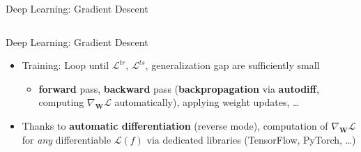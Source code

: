 \begin{frame}{Deep Learning: Gradient Descent}
\begin{columns}[T]
\begin{column}{0.6\textwidth}
\end{column}
\end{columns}
\end{frame}

\begin{frame}{Deep Learning: Gradient Descent}
\protect\hypertarget{deep-learning-gradient-descent-1}{}
\begin{itemize}
\tightlist
\item
  Training: Loop until \(\mathcal{L}^{tr}\), \(\mathcal{L}^{ts}\),
  generalization gap are sufficiently small

  \begin{itemize}
  \tightlist
  \item
    \textbf{forward} pass, \textbf{backward} pass
    (\textbf{backpropagation} via \textbf{autodiff}, computing
    \(\nabla_\mathbf{W} \mathcal{L}\) automatically), applying weight
    updates, \ldots{}
  \end{itemize}
\item
  Thanks to \textbf{automatic differentiation} (reverse mode),
  computation of \(\nabla_\mathbf{W} \mathcal{L}\) for \emph{any}
  differentiable \(\mathcal{L}(f)\) via dedicated libraries (TensorFlow,
  PyTorch, \ldots)
\end{itemize}

\end{frame}

